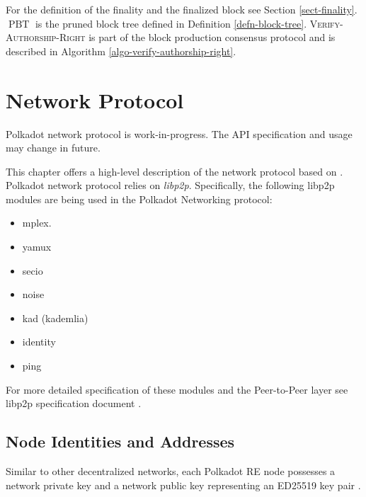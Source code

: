 \documentclass{book}
\newcommand{\tmem}[1]{{\em #1\/}}
\newcommand{\tmname}[1]{\textsc{#1}}
\newcommand{\tmop}[1]{\ensuremath{\operatorname{#1}}}
\newcommand{\tmsamp}[1]{\textsf{#1}}
\newcommand{\tmtextit}[1]{{\itshape{#1}}}
\newcommand{\tmtextsc}[1]{{\scshape{#1}}}
\newcommand{\tmtextsf}[1]{{\sffamily{#1}}}
\providecommand{\tmem}[1]{\tmtextit{#1}}
\providecommand{\tmname}[1]{\tmtextsc{#1}}
\providecommand{\tmop}[1]{\ensuremath{\mathrm{#1}}}
\providecommand{\tmsamp}[1]{\tmtextsf{#1}}
\providecommand{\tmtextit}[1]{\tmtextit{#1}}
\begin{document}
\hrulefill{\medskip}

For the definition of the finality and the finalized block see Section
\ref{sect-finality}. $\tmop{PBT}$ is the pruned block tree defined in
Definition \ref{defn-block-tree}. {\tmname{Verify-Authorship-Right}} is part
of the block production consensus protocol and is described in Algorithm
\ref{algo-verify-authorship-right}.

\chapter{Network
Protocol\label{sect-network-interactions}}\label{network-protocol}

\begin{warning}
  Polkadot network protocol is work-in-progress. The API specification and
  usage may change in future.
\end{warning}

This chapter offers a high-level description of the network protocol based on
{\cite{parity_technologies_substrate_2019}}. Polkadot network protocol relies
on {\tmem{libp2p}}. Specifically, the following libp2p modules are being used
in the Polkadot Networking protocol:
\begin{itemize}
  \item {\tmsamp{mplex.}}
  
  \item {\tmsamp{yamux}}
  
  \item {\tmsamp{secio}}
  
  \item {\tmsamp{noise}}
  
  \item {\tmsamp{kad}} (kademlia)
  
  \item {\tmsamp{identity}}
  
  \item {\tmsamp{ping}}
\end{itemize}
For more detailed specification of these modules and the Peer-to-Peer layer
see libp2p specification document {\cite{protocol_labs_libp2p_2019}}.

\section{Node Identities and Addresses}

Similar to other decentralized networks, each Polkadot RE node possesses a
network private key and a network public key representing an ED25519 key pair
{\cite{liusvaara_edwards-curve_2017}}.
\end{document}

